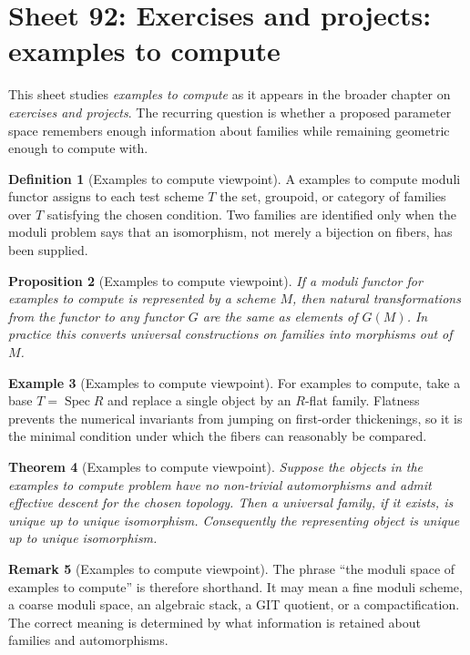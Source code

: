\documentclass[11pt]{amsart}
\newtheorem{theorem}{Theorem}[section]
\newtheorem{proposition}[theorem]{Proposition}
\theoremstyle{definition}
\newtheorem{definition}[theorem]{Definition}
\newtheorem{example}[theorem]{Example}
\newtheorem{remark}[theorem]{Remark}
\newcommand{\Spec}{\operatorname{Spec}}
\begin{document}
\section{Sheet 92: Exercises and projects: examples to compute}
This sheet studies \emph{examples to compute} as it appears in the broader chapter on \emph{exercises and projects}.  The recurring question is whether a proposed parameter space remembers enough information about families while remaining geometric enough to compute with.
\begin{definition}[Examples to compute viewpoint]
A examples to compute moduli functor assigns to each test scheme $T$ the set, groupoid, or category of families over $T$ satisfying the chosen condition.  Two families are identified only when the moduli problem says that an isomorphism, not merely a bijection on fibers, has been supplied.
\end{definition}
\begin{proposition}[Examples to compute viewpoint]
If a moduli functor for examples to compute is represented by a scheme $M$, then natural transformations from the functor to any functor $G$ are the same as elements of $G(M)$.  In practice this converts universal constructions on families into morphisms out of $M$.
\end{proposition}
\begin{example}[Examples to compute viewpoint]
For examples to compute, take a base $T=\Spec R$ and replace a single object by an $R$-flat family.  Flatness prevents the numerical invariants from jumping on first-order thickenings, so it is the minimal condition under which the fibers can reasonably be compared.
\end{example}
\begin{theorem}[Examples to compute viewpoint]
Suppose the objects in the examples to compute problem have no non-trivial automorphisms and admit effective descent for the chosen topology.  Then a universal family, if it exists, is unique up to unique isomorphism.  Consequently the representing object is unique up to unique isomorphism.
\end{theorem}
\begin{remark}[Examples to compute viewpoint]
The phrase ``the moduli space of examples to compute'' is therefore shorthand.  It may mean a fine moduli scheme, a coarse moduli space, an algebraic stack, a GIT quotient, or a compactification.  The correct meaning is determined by what information is retained about families and automorphisms.
\end{remark}
\end{document}
